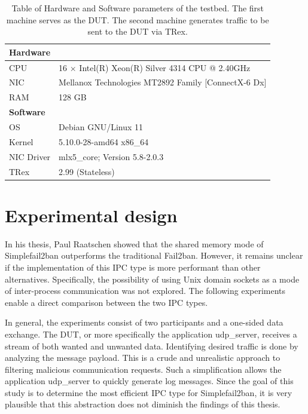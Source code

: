 \begin{table}[b!]
    \renewcommand{\arraystretch}{1.5}
    \caption[Testbed specs]{Table of Hardware and Software parameters of the testbed.
    The first machine serves as the \ac{DUT}.
	The second machine generates traffic to be sent to the \ac{DUT} via TRex.}\label{tab:specs}
    \centering
    \small
    \begin{tabular}{ll}
        \toprule
        \multicolumn{2}{l}{\textbf{Hardware}} \\ \midrule
        CPU     & 16 $\times$ Intel(R) Xeon(R) Silver 4314 \ac{CPU} @ 2.40GHz \\
        NIC     & Mellanox Technologies MT2892 Family [ConnectX-6 Dx] \\
        RAM     & 128 GB \\ \bottomrule

        \multicolumn{2}{l}{\textbf{Software}} \\ \midrule
        OS          & Debian \ac{GNU}/Linux 11 \\
        Kernel      & 5.10.0-28-amd64 x86\_64 \\
        NIC Driver  & mlx5\_core; Version 5.8-2.0.3 \\
        TRex        & 2.99 (Stateless) \\ \bottomrule
    \end{tabular}
\end{table}

\section{Experimental design}
In his thesis\cite{raatschen:ipc}, Paul Raatschen showed that the shared memory mode of Simplefail2ban outperforms the traditional Fail2ban.
However, it remains unclear if the implementation of this \ac{IPC} type is more performant than other alternatives.
Specifically, the possibility of using Unix domain sockets as a mode of inter-process communication was not explored.
The following experiments enable a direct comparison between the two \ac{IPC} types.

\noindent
In general, the experiments consist of two participants and a one-sided data exchange.
The \ac{DUT}, or more specifically the application udp\_server, receives a stream of both wanted and unwanted data.
Identifying desired traffic is done by analyzing the message payload.
This is a crude and unrealistic approach to filtering malicious communication requests.
Such a simplification allows the application udp\_server to quickly generate log messages.
Since the goal of this study is to determine the most efficient \ac{IPC} type for Simplefail2ban, it is very plausible that this abstraction does not diminish the findings of this thesis.

